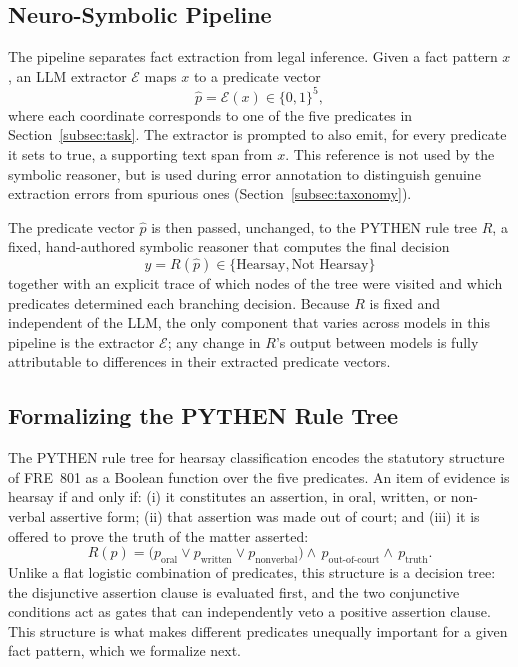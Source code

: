 \subsection{Neuro-Symbolic Pipeline}
\label{subsec:pipeline}
The pipeline separates fact extraction from legal inference. Given a fact pattern $x$, an LLM extractor $\mathcal{E}$ maps $x$ to a predicate vector
\begin{equation}
\label{eq:extractor}
\hat{p} = \mathcal{E}(x) \in \{0,1\}^5,
\end{equation}
where each coordinate corresponds to one of the five predicates in Section~\ref{subsec:task}. The extractor is prompted to also emit, for every predicate it sets to true, a supporting text span from $x$. This reference is not used by the symbolic reasoner, but is used during error annotation to distinguish genuine extraction errors from spurious ones (Section~\ref{subsec:taxonomy}).

The predicate vector $\hat{p}$ is then passed, unchanged, to the PYTHEN rule tree $R$, a fixed, hand-authored symbolic reasoner that computes the final decision
\begin{equation}
\label{eq:rule-tree}
\hat{y} = R(\hat{p}) \in \{\text{Hearsay}, \text{Not Hearsay}\}
\end{equation}
together with an explicit trace of which nodes of the tree were visited and which predicates determined each branching decision. Because $R$ is fixed and independent of the LLM, the only component that varies across models in this pipeline is the extractor $\mathcal{E}$; any change in $R$'s output between models is fully attributable to differences in their extracted predicate vectors.

\subsection{Formalizing the PYTHEN Rule Tree}
\label{subsec:tree}
The PYTHEN rule tree for hearsay classification encodes the statutory structure of FRE~801 as a Boolean function over the five predicates. An item of evidence is hearsay if and only if: (i) it constitutes an assertion, in oral, written, or non-verbal assertive form; (ii) that assertion was made out of court; and (iii) it is offered to prove the truth of the matter asserted:
\begin{equation}
\label{eq:hearsay-rule}
R(p) = \big(p_{\text{oral}} \lor p_{\text{written}} \lor p_{\text{nonverbal}}\big) \land\, p_{\text{out-of-court}} \land\, p_{\text{truth}}.
\end{equation}
Unlike a flat logistic combination of predicates, this structure is a decision tree: the disjunctive assertion clause is evaluated first, and the two conjunctive conditions act as gates that can independently veto a positive assertion clause. This structure is what makes different predicates unequally important for a given fact pattern, which we formalize next.

